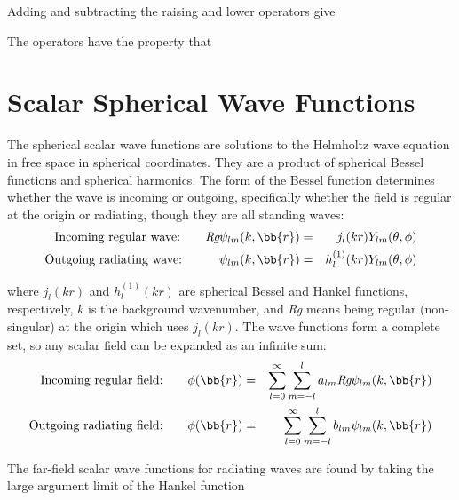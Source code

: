 Adding and subtracting the raising and lower operators give 

The operators have the property that 


\section{Scalar Spherical Wave Functions}

The spherical scalar wave functions are solutions to the Helmholtz wave equation in free space in spherical coordinates. They are a product of spherical Bessel functions and spherical harmonics.  The form of the Bessel function determines whether the wave is incoming or outgoing, specifically whether the field is regular at the origin or radiating, though they are all standing waves:  
\begin{eqnarray}
\textrm{Incoming regular wave:} \quad \quad\textit{Rg} \psi_{lm}(k,\bb{r}) &=& j_l(kr) Y_{lm}(\theta,\phi) \\
\textrm{Outgoing radiating wave:} \quad  \quad \quad \psi_{lm}(k,\bb{r}) &=& h_l^{(1)}(kr) Y_{lm}(\theta,\phi) 
\end{eqnarray}

\noindent where $j_l(kr)$ and $h_l^{(1)}(kr)$ are spherical Bessel and Hankel functions, respectively, $k$ is the background wavenumber, and \textit{Rg} means being regular (non-singular) at the origin which uses $j_l(kr)$. The wave functions form a complete set, so any scalar field can be expanded as an infinite sum: 
\begin{eqnarray}
\textrm{Incoming regular field:} \quad \quad \phi(\bb{r}) &=& \sum_{l=0}^{\infty} \sum_{m=-l}^l a_{lm} \textit{Rg} \psi_{lm}(k,\bb{r})  \\
\textrm{Outgoing radiating field:} \quad \quad \phi(\bb{r}) &=& \sum_{l=0}^{\infty} \sum_{m=-l}^l b_{lm} \psi_{lm}(k,\bb{r}) 
\end{eqnarray}

The far-field scalar wave functions for radiating waves are found by taking the large argument limit of the Hankel function


